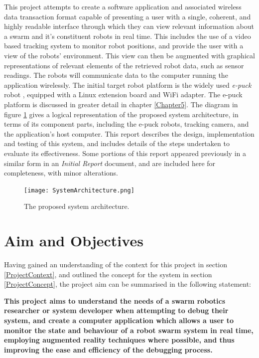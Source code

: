 This project attempts to create a software application and associated wireless data transaction format capable of presenting a user with a single, coherent, and highly readable interface through which they can view relevant information about a swarm and it's constituent robots in real time. This includes the use of a video based tracking system to monitor robot positions, and provide the user with a view of the robots' environment. This view can then be augmented with graphical representations of relevant elements of the retrieved robot data, such as sensor readings. The robots will communicate data to the computer running the application wirelessly. The initial target robot platform is the widely used \textit{e-puck} robot \cite{epuck}, equipped with a Linux extension board and WiFi adapter. The e-puck platform is discussed in greater detail in chapter \ref{Chapter5}. The diagram in figure \ref{fig:SystemArchitecture} gives a logical representation of the proposed system architecture, in terms of its component parts, including the e-puck robots, tracking camera, and the application's host computer. This report describes the design, implementation and testing of this system, and includes details of the steps undertaken to evaluate its effectiveness. Some portions of this report appeared previously in a similar form in an \textit{Initial Report} document, and are included here for completeness, with minor alterations.

\begin{figure}
	\begin{center}
	\texttt{[image: SystemArchitecture.png]}
	\decoRule
	\caption[Proposed system architecture]{The proposed system architecture.}
	\label{fig:SystemArchitecture}
	\end{center}
\end{figure}


\section{Aim and Objectives}
Having gained an understanding of the context for this project in section \ref{ProjectContext}, and outlined the concept for the system in section \ref{ProjectConcept}, the project aim can be summarised in the following statement: 

\textbf{This project aims to understand the needs of a swarm robotics researcher or system developer when attempting to debug their system, and create a computer application which allows a user to monitor the state and behaviour of a robot swarm system in real time, employing augmented reality techniques where possible, and thus improving the ease and efficiency of the debugging process.}

